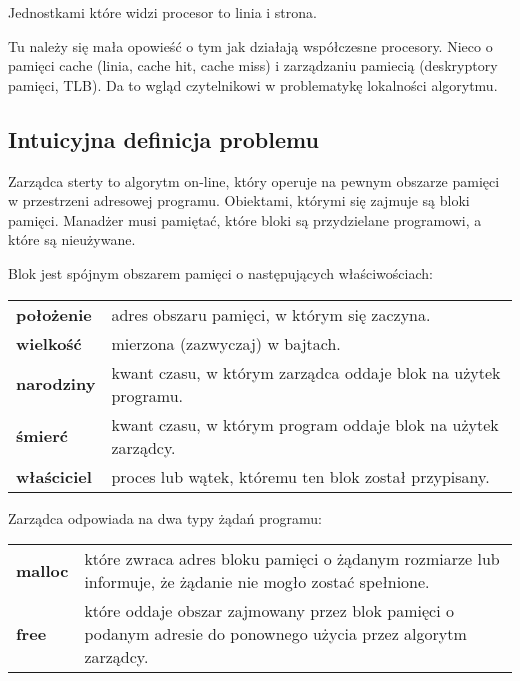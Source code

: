 \documentclass[12pt,a4paper,titlepage,twoside]{mwart}
\begin{document}
Jednostkami które widzi procesor to linia i strona.

Tu należy się mała opowieść o tym jak działają współczesne procesory. Nieco o
pamięci cache (linia, cache hit, cache miss) i zarządzaniu pamiecią
(deskryptory pamięci, TLB). Da to wgląd czytelnikowi w problematykę lokalności
algorytmu.

\subsection{Intuicyjna definicja problemu}

Zarządca sterty to algorytm on-line, który operuje na pewnym obszarze pamięci
w przestrzeni adresowej programu. Obiektami, którymi się zajmuje są bloki
pamięci. Manadżer musi pamiętać, które bloki są przydzielane programowi, a
które są nieużywane.

\parbox{\textwidth}{
Blok jest spójnym obszarem pamięci o następujących właściwościach:
\par\vspace{2mm}
\begin{tabularx}{\textwidth}{@{\hspace{4ex}}lX@{}}
	\textbf{położenie}	& adres obszaru pamięci, w którym się zaczyna. \\
	\textbf{wielkość}	& mierzona (zazwyczaj) w bajtach. \\
	\textbf{narodziny}	& kwant czasu, w którym zarządca oddaje blok na użytek programu. \\
	\textbf{śmierć}		& kwant czasu, w którym program oddaje blok na użytek zarządcy. \\
	\textbf{właściciel}	& proces lub wątek, któremu ten blok został przypisany. \\
\end{tabularx}
}

\parbox{\textwidth}{
Zarządca odpowiada na dwa typy żądań programu:
\par\vspace{2mm}
\begin{tabularx}{\textwidth}{@{\hspace{4ex}}lX@{}}
	\textbf{malloc} & które zwraca adres bloku pamięci o żądanym
	rozmiarze lub informuje, że żądanie nie mogło zostać spełnione. \\

	\textbf{free} & które oddaje obszar zajmowany przez blok pamięci o
	podanym adresie do ponownego użycia przez algorytm zarządcy. \\
\end{tabularx}
}
\end{document}
